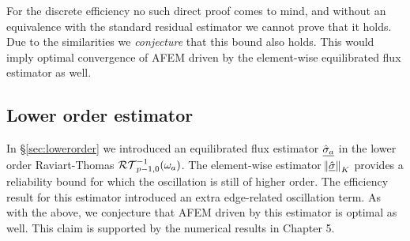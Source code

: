 \documentclass[thesis.tex]{subfiles}
\begin{document}
  For the discrete efficiency no such direct proof comes to mind, and without an equivalence  with the standard residual estimator 
  we cannot prove that it holds. Due to the similarities we \emph{conjecture} that this bound also holds. This would imply optimal convergence of AFEM
  driven by the element-wise equilibrated flux estimator as well.

  \subsection{Lower order estimator}
  In \S\ref{sec:lowerorder} we introduced an equilibrated flux estimator $\underline{\hat \sigma_a}$ in the lower order Raviart-Thomas $\mathcal{RT}_{p-1,0}^{-1}(\omega_a)$. 
  The element-wise estimator $\norm{\underline{\hat \sigma}}_K$ provides a reliability bound for which the oscillation is still of higher order. The
  efficiency result for this estimator introduced an extra edge-related oscillation term. As with the above, we conjecture that AFEM driven
  by this estimator is optimal as well. This claim is supported by the numerical results in Chapter 5.
\end{document}

